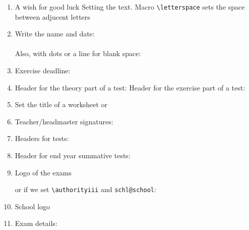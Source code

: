 \documentclass[12pt,a4page]{article}
\begin{document}
\begin{enumerate}
\item A wish for good luck
  \wish
  Setting the text. Macro \verb/\letterspace/ sets the space between adjucent letters
  \makeatletter
  \def\schl@wish{\letterspace{10} ΚΑΛΗ ΤΥΧΗ}
  \makeatother
  \wish
\item Write the name and date:\hspace{2em} \fullname{}\\
  \datefield{} \\
  Also, with dots or a line for blank space: \hspace{3em} \\ \datefield{\blankspace{10em}}
\item Exercise deadline: \hspace{3em} \\
\item Header for the theory part of a test: \theorypart
  Header for the exercise part of a test: \exercisepart
\item Set the title of a worksheet
  \worksheettitle{}
  or
\item Teacher/headmaster signatures:\\
  \hfill
\item Headers for tests:
  \examtitle{}
\item Header for end year summative tests:
\item Logo of the  exams

  \authoritylogo

  or if we set \verb+\authorityiii+ and \verb+schl@school+:

  \authoritylogo
\item School logo

  \subject{Μαθηματικά}
  \schoollogo{200pt}
\item Exam details:


\end{enumerate}
\end{document}
